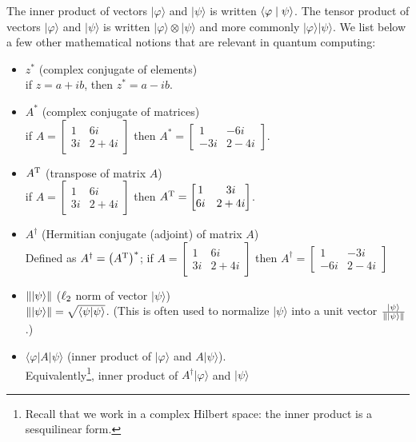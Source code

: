 \documentclass[11pt]{article}
\newcommand{\ket}[1]{|#1\rangle}
\newcommand{\bra}[1]{\langle #1|}
\def\twobytwomatrix[#1,#2,#3,#4]{
\begin{bmatrix}
	#1 & #2 \\
	#3 & #4
\end{bmatrix}
}
\def\dotproduct[#1,#2]{
\langle #1 | #2 \rangle
}
\newcommand{\transpose}[1]{{#1}^{\rm T}} 			%
\newcommand{\adjoint}[1]{{#1}^{\dagger}} 			%
\begin{document}
The inner product of vectors $\ket{\varphi}$ and $\ket{\psi}$ is written $\dotprod{ \varphi }{ \psi }$.
The tensor product of vectors $\ket{\varphi}$ and $\ket{\psi}$ is written $\ket{\varphi} \otimes \ket{\psi}$  and more commonly $\ket{\varphi}\ket{\psi}$.
We list below a few other mathematical notions that are relevant in quantum computing:

\begin{itemize}[-]
\item $z^\ast$ (complex conjugate of elements)\\  if $z=a+ib$, then $z^\ast = a - ib$.
\item $A^\ast$ (complex conjugate of matrices)\\ if $A = \twobytwomatrix[1,6i,3i,2+4i]$ then $A^\ast = \twobytwomatrix[1,-6i,-3i,2-4i]$.
\item $\transpose{A}$  (transpose of matrix $A$)\\ if $A = \twobytwomatrix[1,6i,3i,2+4i]$ then $\transpose{A} = \twobytwomatrix[1,3i,6i,2+4i]$.
\item $\adjoint{A}$  (Hermitian conjugate (adjoint) of matrix $A$)\\
Defined as $\adjoint{A} = \left(\transpose{A}\right)^\ast$; if $A = \twobytwomatrix[1,6i,3i,2+4i]$ then $A^{\dag} = \twobytwomatrix[1,-3i,-6i,2-4i]$
\item $\norm{\ket{\psi}}$ ($\lp[2]$ norm of vector $\ket{\psi}$)\\
$\norm{\ket{\psi}} = \sqrt{\dotproduct[{\psi}, {\psi}]}$. 
 (This is often used to normalize $\ket{\psi}$ into a unit vector $\frac{\ket{\psi}}{\norm{\ket{\psi}}}$.)

\item $\bra{\varphi}A\ket{\psi}$ (inner product of $\ket{\varphi}$ and $A\ket{\psi}$). \\
Equivalently\footnote{Recall that we work in a complex Hilbert space: the inner product is a sesquilinear form.}, inner product of $A^{\dag}\ket{\varphi}$ and $\ket{\psi}$

\end{itemize}
\end{document}
